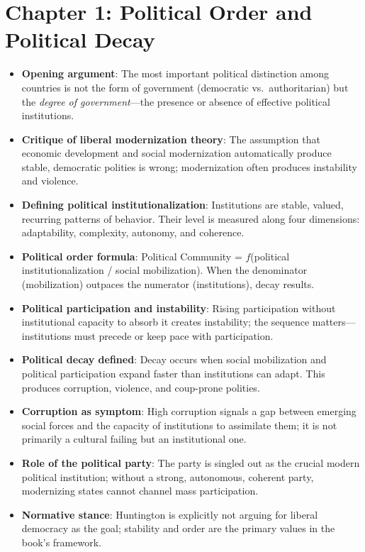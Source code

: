 \documentclass[12pt]{article}
\begin{document}
\section{Chapter 1: Political Order and Political Decay}

\begin{itemize}[leftmargin=*, itemsep=4pt]
    \item \textbf{Opening argument}: The most important political distinction among countries is not the form of government (democratic vs.\ authoritarian) but the \emph{degree of government}---the presence or absence of effective political institutions.
    \item \textbf{Critique of liberal modernization theory}: The assumption that economic development and social modernization automatically produce stable, democratic polities is wrong; modernization often produces instability and violence.
    \item \textbf{Defining political institutionalization}: Institutions are stable, valued, recurring patterns of behavior. Their level is measured along four dimensions: adaptability, complexity, autonomy, and coherence.
    \item \textbf{Political order formula}: Political Community = $f$(political institutionalization / social mobilization). When the denominator (mobilization) outpaces the numerator (institutions), decay results.
    \item \textbf{Political participation and instability}: Rising participation without institutional capacity to absorb it creates instability; the sequence matters---institutions must precede or keep pace with participation.
    \item \textbf{Political decay defined}: Decay occurs when social mobilization and political participation expand faster than institutions can adapt. This produces corruption, violence, and coup-prone polities.
    \item \textbf{Corruption as symptom}: High corruption signals a gap between emerging social forces and the capacity of institutions to assimilate them; it is not primarily a cultural failing but an institutional one.
    \item \textbf{Role of the political party}: The party is singled out as the crucial modern political institution; without a strong, autonomous, coherent party, modernizing states cannot channel mass participation.
    \item \textbf{Normative stance}: Huntington is explicitly not arguing for liberal democracy as the goal; stability and order are the primary values in the book's framework.
\end{itemize}
\end{document}
